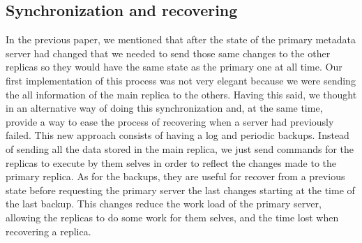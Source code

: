 \subsection{Synchronization and recovering}

In the previous paper, we mentioned that after the state of the primary metadata server had
changed that we needed to send those same changes to the other replicas so they would
have the same state as the primary one at all time. Our first implementation of this process
was not very elegant because we were sending the all information of the main replica to
the others. Having this said, we thought in an alternative way of doing this synchronization
and, at the same time, provide a way to ease the process of recovering when a server had
previously failed.
This new approach consists of having a log and periodic backups. Instead of sending all
the data stored in the main replica, we just send commands for the replicas to execute
by them selves in order to reflect the changes made to the primary replica. As for the
backups, they are useful for recover from a previous state before requesting the primary server the last changes starting at the time of the last backup.
This changes reduce the work load of the primary server, allowing the replicas to do some
work for them selves, and the time lost when recovering a replica.